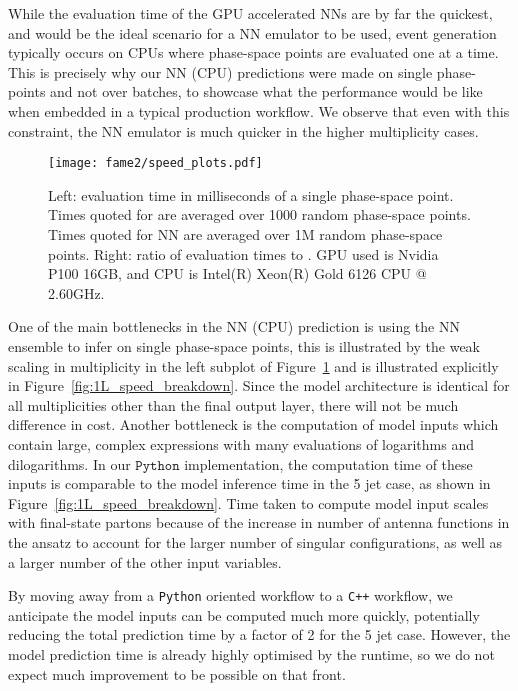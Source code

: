 \documentclass[main.tex]{subfiles}
\begin{document}
While the evaluation time of the GPU accelerated NNs are by far
the quickest, and would be the ideal scenario for a NN emulator to be used,
event generation typically occurs on CPUs where phase-space
points are evaluated one at a time. This is precisely
why our NN (CPU) predictions were made on single phase-points and
not over batches, to showcase what the performance would be like
when embedded in a typical production workflow. We observe that even with
this constraint, the NN emulator is much quicker in the higher
multiplicity cases.

\begin{figure}
    \texttt{[image: fame2/speed\_plots.pdf]}
    \caption{Left: evaluation time in milliseconds of a single phase-space point.
    Times quoted for {\MadGraph} are averaged over 1000 random phase-space
    points. Times quoted for NN are averaged over 1M random phase-space
    points. Right: ratio of evaluation times to {\MadGraph}. GPU used is
    Nvidia P100 16GB, and CPU is Intel(R) Xeon(R) Gold 6126 CPU @ 2.60GHz.}
    \label{fig:1L_speed}
\end{figure}

One of the main bottlenecks in the NN (CPU) prediction is using
the NN ensemble to infer on single phase-space points, this is illustrated
by the weak scaling in multiplicity
in the left subplot of Figure~\ref{fig:1L_speed} and is illustrated
explicitly in Figure~\ref{fig:1L_speed_breakdown}. Since the model
architecture is identical for all multiplicities other than the
final output layer, there will not be much difference in cost.
Another bottleneck is the computation of model inputs which contain
large, complex expressions with many evaluations of logarithms and
dilogarithms. In our $\mathtt{Python}$ implementation,
the computation time of these inputs is comparable to the
model inference time in the 5 jet case, as shown in Figure~\ref{fig:1L_speed_breakdown}.
Time taken to compute model input scales with final-state partons
because of the increase in number of antenna functions
in the ansatz to account for the larger number of singular configurations,
as well as a larger number of the other input variables.

By moving away from a \texttt{Python} oriented workflow
to a \texttt{C++} workflow, we anticipate the model inputs
can be computed much more quickly, potentially reducing the
total prediction time by a factor of 2 for the 5 jet case.
However, the model prediction time is already highly optimised by the {\ONNX} runtime,
so we do not expect much improvement to be possible on that front.
\end{document}
